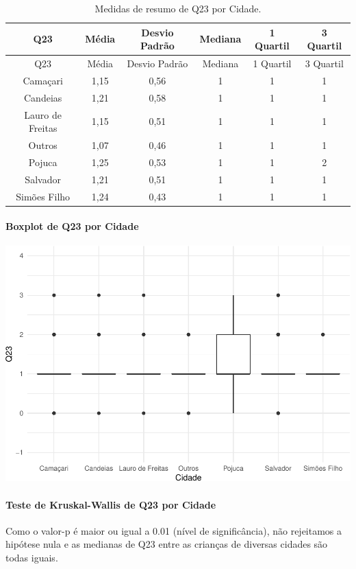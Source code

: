 \documentclass[]{article}
\let\oldparagraph\paragraph
\renewcommand{\paragraph}[1]{\oldparagraph{#1}\mbox{}}
\begin{document}
\begin{longtable}[]{@{}cccccc@{}}
\caption{\label{tab:unnamed-chunk-548}Medidas de resumo de Q23 por Cidade.}\tabularnewline
\toprule
Q23 & Média & Desvio Padrão & Mediana & 1 Quartil & 3 Quartil\tabularnewline
\midrule
\endfirsthead
\toprule
Q23 & Média & Desvio Padrão & Mediana & 1 Quartil & 3 Quartil\tabularnewline
\midrule
\endhead
Camaçari & 1,15 & 0,56 & 1 & 1 & 1\tabularnewline
Candeias & 1,21 & 0,58 & 1 & 1 & 1\tabularnewline
Lauro de Freitas & 1,15 & 0,51 & 1 & 1 & 1\tabularnewline
Outros & 1,07 & 0,46 & 1 & 1 & 1\tabularnewline
Pojuca & 1,25 & 0,53 & 1 & 1 & 2\tabularnewline
Salvador & 1,21 & 0,51 & 1 & 1 & 1\tabularnewline
Simões Filho & 1,24 & 0,43 & 1 & 1 & 1\tabularnewline
\bottomrule
\end{longtable}

\hypertarget{boxplot-de-q23-por-cidade}{%
\paragraph{Boxplot de Q23 por Cidade}\label{boxplot-de-q23-por-cidade}}

\begin{center}\includegraphics[width=0.75\linewidth]{relatorio_covid19_files/figure-latex/unnamed-chunk-549-1} \end{center}

\hypertarget{teste-de-kruskal-wallis-de-q23-por-cidade}{%
\paragraph{Teste de Kruskal-Wallis de Q23 por Cidade}\label{teste-de-kruskal-wallis-de-q23-por-cidade}}

Como o valor-p é maior ou igual a 0.01 (nível de significância), não rejeitamos a hipótese nula e as medianas de Q23 entre as crianças de diversas cidades são todas iguais.
\end{document}
